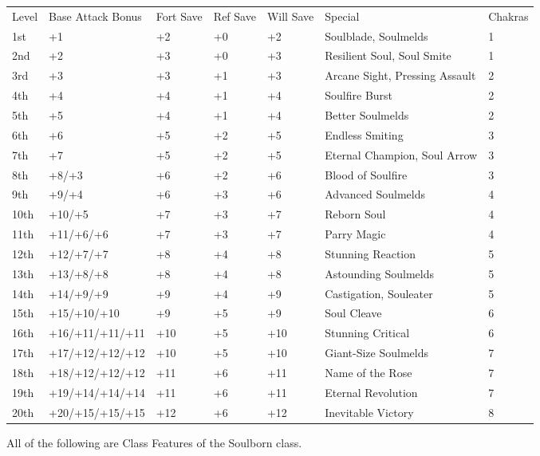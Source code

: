\begin{table}[htb]
\begin{small}
\begin{tabular}{lp{3cm}p{0.7cm}p{0.7cm}p{0.7cm}p{6cm}l}
Level &Base Attack Bonus &Fort Save &Ref Save &Will Save &Special&Chakras\\
1st &+1 &+2 &+0 &+2 &Soulblade, Soulmelds&1\\
2nd &+2 &+3 &+0 &+3 &Resilient Soul, Soul Smite&1\\
3rd &+3 &+3 &+1 &+3 &Arcane Sight, Pressing Assault&2\\
4th &+4 &+4 &+1 &+4 &Soulfire Burst&2\\
5th &+5 &+4 &+1 &+4 &Better Soulmelds&2\\
6th &+6 &+5 &+2 &+5 &Endless Smiting&3\\
7th &+7 &+5 &+2 &+5 &Eternal Champion, Soul Arrow&3\\
8th &+8/+3 &+6 &+2 &+6 &Blood of Soulfire&3\\
9th &+9/+4 &+6 &+3 &+6 &Advanced Soulmelds&4\\
10th &+10/+5 &+7 &+3 &+7 &Reborn Soul&4\\
11th &+11/+6/+6 &+7 &+3 &+7 &Parry Magic&4\\
12th &+12/+7/+7 &+8 &+4 &+8 &Stunning Reaction&5\\
13th &+13/+8/+8 &+8 &+4 &+8 &Astounding Soulmelds&5\\
14th &+14/+9/+9 &+9 &+4 &+9 &Castigation, Souleater&5\\
15th &+15/+10/+10 &+9 &+5 &+9 &Soul Cleave&6\\
16th &+16/+11/+11/+11 &+10 &+5 &+10 &Stunning Critical&6\\
17th &+17/+12/+12/+12 &+10 &+5 &+10 &Giant-Size Soulmelds&7\\
18th &+18/+12/+12/+12 &+11 &+6 &+11 &Name of the Rose&7\\
19th &+19/+14/+14/+14 &+11 &+6 &+11 &Eternal Revolution&7\\
20th &+20/+15/+15/+15 &+12 &+6 &+12 &Inevitable Victory&8\\
\end{tabular}
\end{small}
\end{table}

\smallskip\noindent All of the following are Class Features of the Soulborn class.


